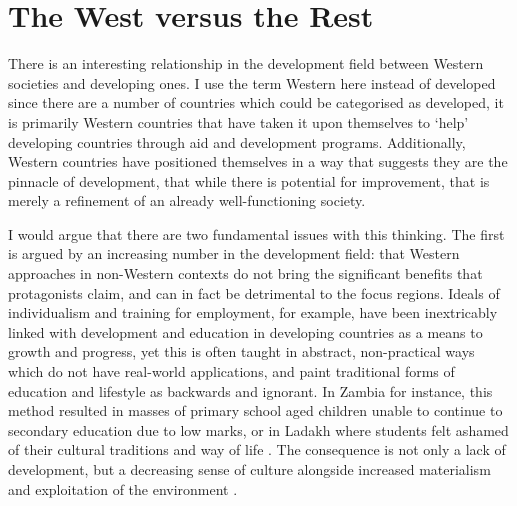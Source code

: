 \section{The West versus the Rest}

There is an interesting relationship in the development field between Western societies and developing ones. I use the term Western here instead of developed since there are a number of countries which could be categorised as developed, it is primarily Western countries that have taken it upon themselves to `help' developing countries through aid and development programs. Additionally, Western countries have positioned themselves in a way that suggests they are the pinnacle of development, that while there is potential for improvement, that is merely a refinement of an already well-functioning society. 

I would argue that there are two fundamental issues with this thinking. The first is argued by an increasing number in the development field: that Western approaches in non-Western contexts do not bring the significant benefits that protagonists claim, and can in fact be detrimental to the focus regions. Ideals of individualism and training for employment, for example, have been inextricably linked with development and education in developing countries as a means to growth and progress, yet this is often taught in abstract, non-practical ways which do not have real-world applications, and paint traditional forms of education and lifestyle as backwards and ignorant. In Zambia for instance, this method resulted in masses of primary school aged children unable to continue to secondary education due to low marks, or in Ladakh where students felt ashamed of their cultural traditions and way of life \citep{Norberg-hodge2016}. The consequence is not only a lack of development, but a decreasing sense of culture alongside increased materialism and exploitation of the environment \citep{Norberg-hodge2016}. 


